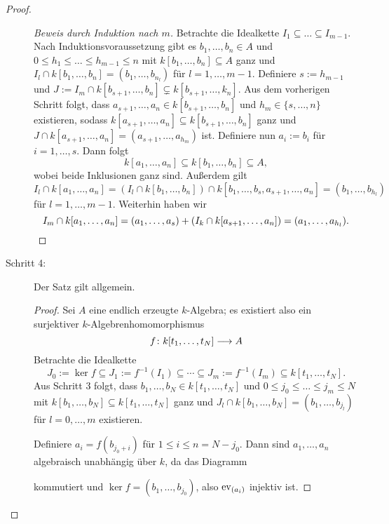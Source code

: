 \documentclass[12pt,a4paper]{scrartcl}
\theoremstyle{cplain}
\theoremstyle{cdef}
\begin{document}
\begin{proof}
\begin{description}
\begin{proof}[Beweis durch Induktion nach $m$]
			Betrachte die Idealkette $I_1\subseteq\dots\subseteq I_{m-1}$. Nach Induktionsvoraussetzung gibt es $b_1,\dots, b_n\in A$ und $0\le h_1\le\dots\le h_{m-1}\le n$ mit $k[b_1,\dots, b_n]\subseteq A$ ganz und $I_l\cap k[b_1,\dots, b_n] = (b_1,\dots, b_{n_l})$ für $l = 1,\dots, m-1$. Definiere $s := h_{m-1}$ und $J := I_m\cap k[b_{s+1},\dots, b_n] \subsetneq k[b_{s+1},\dots, k_n]$. Aus dem vorherigen Schritt folgt, dass $a_{s+1}, \dots, a_n\in k[b_{s+1},\dots, b_n]$ und $h_m\in \{s,\dots, n\}$ existieren, sodass $k[a_{s+1},\dots, a_n]\subseteq k[b_{s+1},\dots, b_n]$ ganz und $J\cap k[a_{s+1},\dots, a_n] = (a_{s+1},\dots, a_{h_m})$ ist. Definiere nun $a_i := b_i$ für $i = 1,\dots, s$. Dann folgt
			\[k[a_1,\dots, a_n] \subseteq k[b_1,\dots, b_n]\subseteq A,\]
			wobei beide Inklusionen ganz sind. Außerdem gilt
			\[I_l\cap k[a_1,\dots, a_n] = (I_l\cap k[b_1,\dots, b_n])\cap k[b_1,\dots, b_s, a_{s+1},\dots, a_n] = (b_1,\dots, b_{h_l})\]
			für $l = 1,\dots, m-1$. Weiterhin haben wir 
			\[I_m\cap k[a_1,\dots, a_n] = (a_1,\dots, a_s)+(I_k\cap k[a_{s+1},\dots, a_n]) = (a_1,\dots, a_{h_l}).\qedhere\]
		\end{proof}
		
		\item[Schritt 4:] Der Satz gilt allgemein.
		\begin{proof}
			Sei $A$ eine endlich erzeugte $k$-Algebra; es existiert also ein surjektiver $k$-Algebrenhomomorphismus
			\[f\colon k[t_1,\dots, t_N]\longrightarrow A\]
			Betrachte die Idealkette 
			\[J_0 := \ker f\subseteq J_1 := f^{-1}(I_1)\subseteq \cdots \subseteq J_m := f^{-1}(I_m)\subseteq k[t_1,\dots, t_N].\]
			Aus Schritt 3 folgt, dass $b_1,\dots, b_N\in k[t_1,\dots, t_N]$ und $0\le j_0\le\dots\le j_m\le N$ mit $k[b_1,\dots, b_N]\subseteq k[t_1,\dots, t_N]$ ganz und $J_l\cap k[b_1,\dots, b_N] = (b_1,\dots, b_{j_l})$ für $l = 0,\ldots,m$ existieren.
			
			Definiere $a_i = f(b_{j_0+i})$ für $1\le i \le n = N-j_0$. Dann sind $a_1,\dots, a_n$ algebraisch unabhängig über $k$, da das Diagramm
			\begin{center}
			\end{center}
			kommutiert und $\ker f = (b_1,\dots, b_{j_0})$, also $\operatorname{ev}_{(a_i)}$ injektiv ist.
			

\end{proof}
\end{description}
\end{proof}
\end{document}
